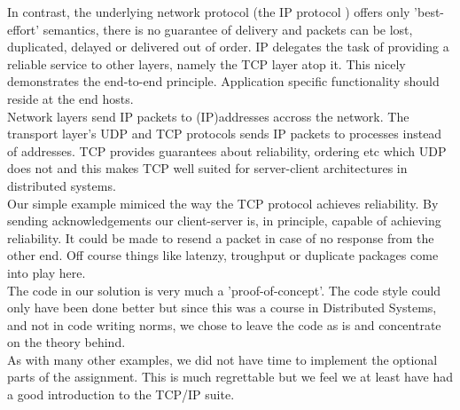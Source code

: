 In contrast, the underlying network protocol (the IP protocol ) offers only 'best-effort' semantics, there is no guarantee of delivery and packets can be lost, duplicated, delayed or delivered out of order. IP delegates the task of providing a reliable service to other layers, namely the TCP layer atop it. This nicely demonstrates the end-to-end principle. Application specific functionality should reside at the end hosts.\\



Network layers send IP packets to (IP)addresses accross the network. The transport layer's UDP and TCP protocols sends IP packets to processes instead of addresses. TCP provides guarantees about reliability, ordering etc which UDP does not and this makes TCP well suited for server-client architectures in distributed systems. \\

Our simple example mimiced the way the TCP protocol achieves reliability. By sending acknowledgements our client-server is, in principle, capable of achieving reliability. It could be made to resend a packet in case of no response from the other end. Off course things like latenzy, troughput or duplicate packages come into play here. \\

The code in our solution is very much a 'proof-of-concept'. The code style could only have been done better but since this was a course in Distributed Systems, and not in code writing norms, we chose to leave the code as is and concentrate on the theory behind.  \\

As with many other examples, we did not have time to implement the optional parts of the assignment. This is much regrettable but we feel we at least have had a good introduction to the TCP/IP suite.

